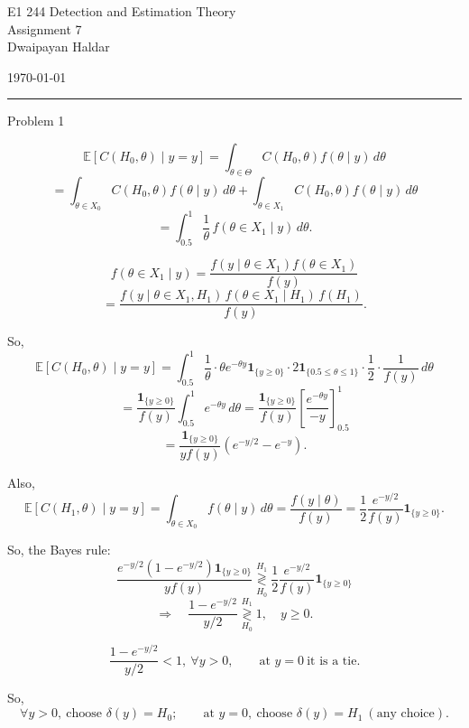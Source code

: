 \documentclass[12pt,a4paper,onecolumn]{exam}
\newcommand{\questionheader}[1]{%
  \begin{tcolorbox}[
    enhanced,
    colback=black,
    coltext=white,
    boxrule=0pt,
    fontupper=\Large\bfseries,
    arc=4mm
  ]
  #1
  \end{tcolorbox}%
}
\begin{document}
\begingroup
    \centering
    \LARGE E1 244 Detection and Estimation Theory\\
    \LARGE Assignment 7\\[0.5em]
    \large Dwaipayan Haldar\par
    \large \today\\[0.5em]
\endgroup
\noindent\rule{\textwidth}{0.5pt}
\printanswers
\renewcommand{\solutiontitle}{\noindent\textbf{Ans:}\enspace}

\questionheader{Problem 1}

\begin{solution}

\[
\mathbb{E}[C(H_0,\theta)\mid y=y]
=\int_{\theta\in\Theta} C(H_0,\theta)f(\theta\mid y)\,d\theta
\]
\[
=\int_{\theta\in X_0} C(H_0,\theta)f(\theta\mid y)\,d\theta
+\int_{\theta\in X_1} C(H_0,\theta)f(\theta\mid y)\,d\theta
\]
\[
=\int_{0.5}^{1} \frac{1}{\theta}\,f(\theta\in X_1\mid y)\,d\theta.
\]

\[
f(\theta\in X_1\mid y)
=\frac{f(y\mid \theta\in X_1)f(\theta\in X_1)}{f(y)}
\]
\[
=\frac{f(y\mid \theta\in X_1,H_1)\,f(\theta\in X_1\mid H_1)\,f(H_1)}{f(y)}.
\]

So,
\[
\mathbb{E}[C(H_0,\theta)\mid y=y]
=\int_{0.5}^{1}\frac{1}{\theta}\cdot
\theta e^{-\theta y}\mathbf{1}_{\{y\ge 0\}}\cdot
2\mathbf{1}_{\{0.5\le \theta\le 1\}}\cdot\frac{1}{2}\cdot\frac{1}{f(y)}\,d\theta
\]
\[
=\frac{\mathbf{1}_{\{y\ge 0\}}}{f(y)}\int_{0.5}^{1}e^{-\theta y}\,d\theta
=\frac{\mathbf{1}_{\{y\ge 0\}}}{f(y)}\left[\frac{e^{-\theta y}}{-y}\right]_{0.5}^{1}
\]
\[
=\frac{\mathbf{1}_{\{y\ge 0\}}}{y f(y)}\left(e^{-y/2}-e^{-y}\right).
\]

Also,
\[
\mathbb{E}[C(H_1,\theta)\mid y=y]
=\int_{\theta\in X_0} f(\theta\mid y)\,d\theta
=\frac{f(y\mid \theta)}{f(y)}
=\frac{1}{2}\frac{e^{-y/2}}{f(y)}\mathbf{1}_{\{y\ge 0\}}.
\]

So, the Bayes rule:
\[
\frac{e^{-y/2}(1-e^{-y/2})\mathbf{1}_{\{y\ge0\}}}{y f(y)}
\underset{H_0}{\overset{H_1}{\gtrless}}
\frac{1}{2}\frac{e^{-y/2}}{f(y)}\mathbf{1}_{\{y\ge0\}}
\]
\[
\Rightarrow\quad
\frac{1-e^{-y/2}}{y/2}
\underset{H_0}{\overset{H_1}{\gtrless}}1,
\quad y\ge0.
\]

\[
\frac{1-e^{-y/2}}{y/2}<1,\ \forall y>0,
\qquad
\text{at }y=0\ \text{it is a tie}.
\]

So,
\[
\forall y>0,\ \text{choose }\delta(y)=H_0;
\qquad
\text{at }y=0,\ \text{choose }\delta(y)=H_1\ (\text{any choice}).
\]


\end{solution}
\end{document}
